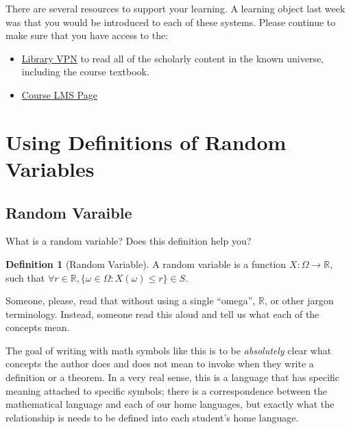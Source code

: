 \documentclass[
]{book}
\providecommand{\tightlist}{%
  \setlength{\itemsep}{0pt}\setlength{\parskip}{0pt}}
\theoremstyle{definition}
\newtheorem{definition}{Definition}[chapter]
\theoremstyle{definition}
\theoremstyle{definition}
\theoremstyle{definition}
\theoremstyle{remark}
\begin{document}
There are several resources to support your learning. A learning object last week was that you would be introduced to each of these systems. Please continue to make sure that you have access to the:

\begin{itemize}
\tightlist
\item
  \href{https://www.lib.berkeley.edu/using-the-libraries/vpn}{Library VPN} to read all of the scholarly content in the known universe, including the course textbook.
\item
  \href{https://www.bcourses.berkeley.edu}{Course LMS Page}
\end{itemize}

\hypertarget{using-definitions-of-random-variables}{%
\section{Using Definitions of Random Variables}\label{using-definitions-of-random-variables}}

\hypertarget{random-varaible}{%
\subsection{Random Varaible}\label{random-varaible}}

What is a random variable? Does this definition help you?

\begin{definition}[Random Variable]
A random variable is a function \(X : \Omega \rightarrow \mathbb{R},\) such that \(\forall r \in \mathbb{R}, \{\omega \in \Omega: X(\omega) \leq r\} \in S\).
\end{definition}

Someone, please, read that without using a single ``omega'', \(\mathbb{R}\), or other jargon terminology. Instead, someone read this aloud and tell us what each of the concepts mean.

The goal of writing with math symbols like this is to be \emph{absolutely} clear what concepts the author does and does not mean to invoke when they write a definition or a theorem. In a very real sense, this is a language that has specific meaning attached to specific symbols; there is a correspondence between the mathematical language and each of our home languages, but exactly what the relationship is needs to be defined into each student's home language.
\end{document}
